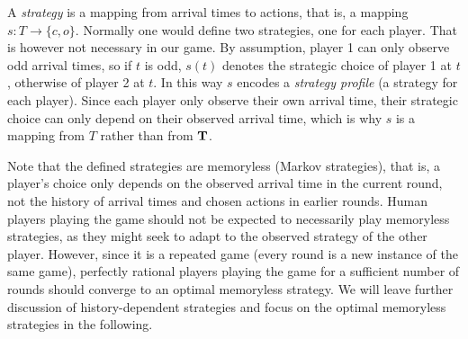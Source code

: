 A \emph{strategy} %
 is a mapping from arrival times to actions, that is, 
   a mapping $s: T \to \{c,o\}$. 
 Normally one would define two strategies, one for each player. That is however not necessary in our game. By assumption, player 1 can only observe odd arrival times, so if $t$ is odd, $s(t)$ denotes the strategic choice of player 1 at $t$, otherwise of player 2 at $t$. In this way $s$ encodes a \emph{strategy profile} (a strategy for each player). Since each player only observe their own arrival time, their strategic choice can only depend on their observed arrival time, which is why $s$ is a mapping from $T$ rather than from $\bf T$.   

Note that the defined strategies are memoryless (Markov strategies), that is, a player's choice only depends on the observed arrival time in the current round, not the history of arrival times and chosen actions in earlier rounds. Human players playing the game should not be expected to necessarily play memoryless strategies, as they might seek to adapt to the observed strategy of the other player. However, since it is a repeated game (every round is a new instance of the same game), perfectly rational players playing the game for a sufficient number of rounds should converge to an optimal memoryless strategy. We will leave further discussion of history-dependent strategies and focus on the optimal memoryless strategies in the following.



